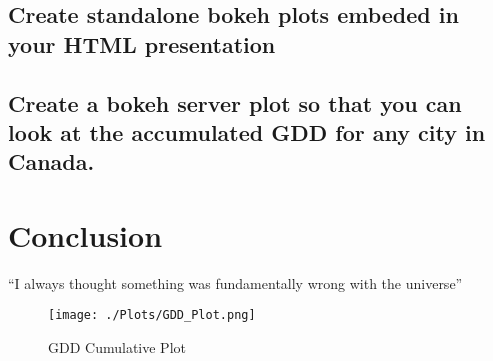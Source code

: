 \documentclass{article}
\begin{document}
\subsection{Create standalone bokeh plots embeded in your HTML presentation}
\subsection{Create a bokeh server plot so that you can look at the accumulated GDD for any city in Canada.}



\section{Conclusion}
``I always thought something was fundamentally wrong with the universe''\citep{adams1995hitchhiker}




\begin{figure}[h!]
\centering
\texttt{[image: ./Plots/GDD\_Plot.png]}
\caption{GDD Cumulative Plot}
\label{fig: GDD Plot}
\end{figure}
\end{document}
